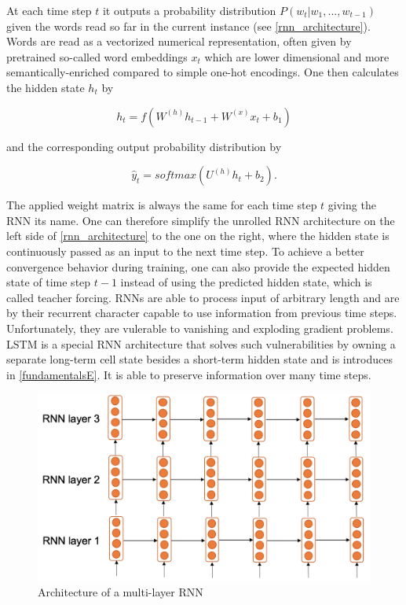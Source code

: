 At each time step $t$ it outputs a probability distribution $P(w_t | w_1, ..., w_{t-1})$ given the words read so far in the current instance (see \autoref{rnn_architecture}). Words are read as a vectorized numerical representation, often given by pretrained so-called word embeddings $x_t$ which are lower dimensional and more semantically-enriched compared to simple one-hot encodings. One then calculates the hidden state $h_t$ by

\begin{equation}
	h_t = f(W^{(h)} h_{t-1} + W^{(x)} x_t + b_1)
\end{equation}

and the corresponding output probability distribution by 

\begin{equation}
	\hat{y}_t = softmax(U^{(h)} h_t + b_2).
\end{equation}

The applied weight matrix is always the same for each time step $t$ giving the \ac{RNN} its name. One can therefore simplify the unrolled \ac{RNN} architecture on the left side of \autoref{rnn_architecture} to the one on the right, where the hidden state is continuously passed as an input to the next time step. To achieve a better convergence behavior during training, one can also provide the expected hidden state of time step $t-1$ instead of using the predicted hidden state, which is called teacher forcing. \acp{RNN} are able to process input of arbitrary length and are by their recurrent character capable to use information from previous time steps. Unfortunately, they are vulerable to vanishing and exploding gradient problems. \ac{LSTM} is a special \ac{RNN} architecture that solves such vulnerabilities by owning a separate long-term cell state besides a short-term hidden state and is introduces in \autoref{fundamentalsE}. It is able to preserve information over many time steps. \cite{Gertz2020}

\begin{figure}[ht]
	\centering
	\includegraphics[width=0.8\linewidth]{figures/multi_layer_rnn.png}
	\caption{Architecture of a multi-layer  \ac{RNN} \cite{Gertz2020}}
	\label{multi_layer_rnn}
\end{figure}

